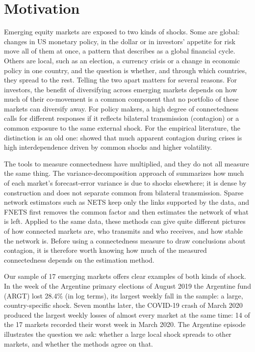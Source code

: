 \section{Motivation}

Emerging equity markets are exposed to two kinds of shocks. Some are global: changes in US monetary policy, in the dollar or in investors' appetite for risk move all of them at once, a pattern that \citet{rey2013dilemma} describes as a global financial cycle. Others are local, such as an election, a currency crisis or a change in economic policy in one country, and the question is whether, and through which countries, they spread to the rest. Telling the two apart matters for several reasons. For investors, the benefit of diversifying across emerging markets depends on how much of their co-movement is a common component that no portfolio of these markets can diversify away. For policy makers, a high degree of connectedness calls for different responses if it reflects bilateral transmission (contagion) or a common exposure to the same external shock. For the empirical literature, the distinction is an old one: \citet{forbes2002contagion} showed that much apparent contagion during crises is high interdependence driven by common shocks and higher volatility.

The tools to measure connectedness have multiplied, and they do not all measure the same thing. The variance-decomposition approach of \citet{diebold2014network} summarizes how much of each market's forecast-error variance is due to shocks elsewhere; it is dense by construction and does not separate common from bilateral transmission. Sparse network estimators such as NETS \citep{barigozzi2019nets} keep only the links supported by the data, and FNETS \citep{barigozzi2024fnets} first removes the common factor and then estimates the network of what is left. Applied to the same data, these methods can give quite different pictures of how connected markets are, who transmits and who receives, and how stable the network is. Before using a connectedness measure to draw conclusions about contagion, it is therefore worth knowing how much of the measured connectedness depends on the estimation method.

Our sample of 17 emerging markets offers clear examples of both kinds of shock. In the week of the Argentine primary elections of August 2019 the Argentine fund (ARGT) lost 28.4\% (in log terms), its largest weekly fall in the sample: a large, country-specific shock. Seven months later, the COVID-19 crash of March 2020 produced the largest weekly losses of almost every market at the same time: 14 of the 17 markets recorded their worst week in March 2020. The Argentine episode illustrates the question we ask: whether a large local shock spreads to other markets, and whether the methods agree on that.
